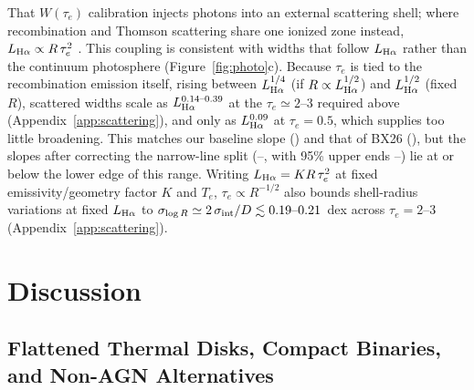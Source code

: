 \documentclass[twocolumn,linenumbers]{aastex701}
\newcommand{\sigint}{\sigma_{\rm int}}
\newcommand{\LHa}{L_{\rm H\alpha}}
\newcommand{\BX}{BX26}
\begin{document}
That $W(\tau_e)$ calibration injects photons into an external scattering shell; where recombination and Thomson scattering share one ionized zone instead, $\LHa\propto R\,\tau_e^{2}$ \citep{Rusakov2026,Sneppen2026}.
This coupling is consistent with widths that follow $\LHa$ rather than the continuum photosphere (Figure~\ref{fig:photo}c).
Because $\tau_e$ is tied to the recombination emission itself, rising between $\LHa^{1/4}$ (if $R\propto\LHa^{1/2}$) and $\LHa^{1/2}$ (fixed $R$), scattered widths scale as $\LHa^{\shellSlopeLo{}\text{--}\shellSlopeHi{}}$ at the $\tau_e\simeq2$--3 required above (Appendix~\ref{app:scattering}), and only as $\LHa^{\tauPhLo{}}$ at $\tau_e=0.5$, which supplies too little broadening.
This matches our baseline slope (\Fb{}) and that of \BX{} (\Xb{}), but the slopes after correcting the narrow-line split (\FbNarFix{}--\FbNarOIII{}, with 95\% upper ends \FbNarFixhi{}--\FbNarOIIIhi{}) lie at or below the lower edge of this range.
Writing $\LHa=K R\,\tau_e^{2}$ at fixed emissivity/geometry factor $K$ and $T_e$, $\tau_e\propto R^{-1/2}$ also bounds shell-radius variations at fixed $\LHa$ to $\sigma_{\log R}\simeq2\,\sigint/D\lesssim\sigRThree{}\text{--}\sigRTwo{}$~dex across $\tau_e=2$--3 (Appendix~\ref{app:scattering}).

\section{Discussion} \label{sec:discussion}

\subsection{Flattened Thermal Disks, Compact Binaries, and Non-AGN Alternatives} \label{sec:alternatives}
\end{document}

